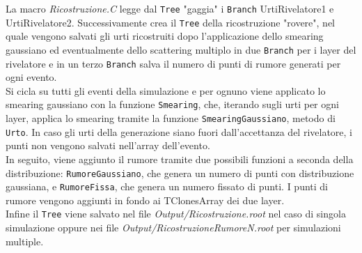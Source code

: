 \documentclass[11pt,a4paper]{article}
\begin{document}
\par La macro \textit{Ricostruzione.C} legge dal \lstinline{Tree} "gaggia" i \lstinline{Branch} UrtiRivelatore1 e UrtiRivelatore2. Successivamente crea il \lstinline{Tree} della ricostruzione "rovere", nel quale vengono salvati gli urti ricostruiti dopo l'applicazione dello smearing gaussiano ed eventualmente dello scattering multiplo in due \lstinline{Branch} per i layer del rivelatore e in un terzo \lstinline{Branch} salva il numero di punti di rumore generati per ogni evento.\\
Si cicla su tutti gli eventi della simulazione e per ognuno viene applicato lo smearing gaussiano con la funzione \lstinline{Smearing}, che, iterando sugli urti per ogni layer, applica lo smearing tramite la funzione \lstinline{SmearingGaussiano}, metodo di \lstinline{Urto}. In caso gli urti della generazione siano fuori dall'accettanza del rivelatore, i punti non vengono salvati nell'array dell'evento.\\
In seguito, viene aggiunto il rumore tramite due possibili funzioni a seconda della distribuzione: \lstinline{RumoreGaussiano}, che genera un numero di punti con distribuzione gaussiana, e \lstinline{RumoreFissa}, che genera un numero fissato di punti. I punti di rumore vengono aggiunti in fondo ai TClonesArray dei due layer.\\
Infine il \lstinline{Tree} viene salvato nel file \textit{Output/Ricostruzione.root} nel caso di singola simulazione oppure nei file \textit{Output/RicostruzioneRumoreN.root} per simulazioni multiple.\\
\end{document}
